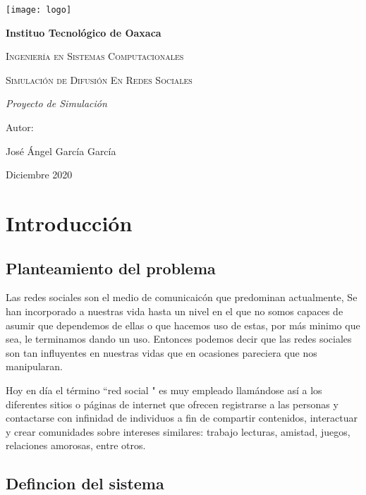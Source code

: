 \documentclass{article}
\begin{document}
	
	
	
	\begin{titlepage}
		\centering
		{\texttt{[image: logo]}\par}
		\vspace{1cm}
		{\bfseries\LARGE Instituo Tecnológico de Oaxaca \par}
		\vspace{1cm}
		{\scshape\Large Ingeniería en Sistemas Computacionales  \par}
		\vspace{3cm}
		{\scshape\Huge Simulación de Difusión En Redes Sociales \par}
		\vspace{3cm}
		{\itshape\Large Proyecto de Simulación \par}
		\vfill
		{\Large Autor: \par}
		{\Large José Ángel García García \par}
		\vfill
		{\Large Diciembre 2020 \par}
		\end{titlepage}
	
\tableofcontents
\newpage
	
\section{Introducción}
 
 \subsection{Planteamiento del problema}
 Las redes sociales son el medio de comunicaicón que predominan actualmente, Se han incorporado a nuestras vida hasta un nivel en el que no somos capaces de asumir que dependemos de ellas o que hacemos uso de estas, por más minimo que sea, le terminamos dando un uso. Entonces podemos decir que las redes sociales son tan influyentes en nuestras vidas que en ocasiones pareciera que nos manipularan.
  
 Hoy en día el término “red social " es muy empleado llamándose así a los diferentes sitios o páginas de internet que ofrecen registrarse a las personas y contactarse con infinidad de individuos a fin  de compartir contenidos, interactuar y crear comunidades sobre intereses similares: trabajo lecturas, amistad, juegos, relaciones amorosas, entre otros.
 
 \subsection{Defincion del sistema}
 
\end{document}

